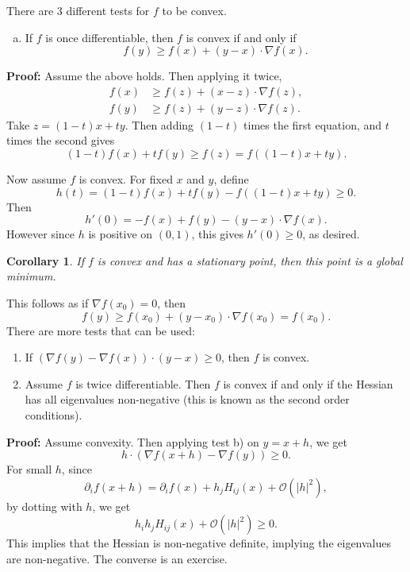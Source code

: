 \documentclass[12pt]{article}
\newtheorem{corollary}{Corollary}[section]
\theoremstyle{definition}
\theoremstyle{remark}
\begin{document}
There are 3 different tests for $f$ to be convex.

\begin{enumerate}[a)]
	\item If $f$ is once differentiable, then $f$ is convex if and only if
		\[
			f(y) \geq f(x) + (y - x) \cdot \nabla f(x)
		.\]
\end{enumerate}

\begin{adjustbox}{minipage = \columnwidth - 25.5pt, margin=1em, frame=1pt, margin=0em}
\textbf{Proof:} Assume the above holds. Then applying it twice,
\begin{align*}
	f(x) &\geq f(z) + (x - z) \cdot \nabla f(z), \\
	f(y) &\geq f(z) + (y - z) \cdot \nabla f(z).
\end{align*}
Take $z = (1 - t)x + ty$. Then adding $(1 - t)$ times the first equation, and $t$ times the second gives
\[
	(1 - t)f(x) + tf(y) \geq f(z) = f((1 - t)x + ty)
.\]
\end{adjustbox}

\begin{adjustbox}{minipage = \columnwidth - 25.5pt, margin=1em, frame=1pt, margin=0em}
	Now assume $f$ is convex. For fixed $x$ and $y$, define
	\[
		h(t) = (1 - t)f(x) + tf(y) - f((1 - t)x + ty) \geq 0
	.\]
	Then
	\[
		h'(0) = -f(x) + f(y) - (y - x) \cdot \nabla f(x)
	.\]
	However since $h$ is positive on $(0, 1)$, this gives $h'(0) \geq 0$, as desired.
\end{adjustbox}

\begin{corollary}
	If $f$ is convex and has a stationary point, then this point is a global minimum.
\end{corollary}

This follows as if $\nabla f(x_0) = 0$, then
\[
	f(y) \geq f(x_0) + (y - x_0) \cdot \nabla f(x_0) = f(x_0)
.\]
There are more tests that can be used:
\begin{enumerate}[resume*]
	\item If $(\nabla f(y) - \nabla f(x)) \cdot (y - x) \geq 0$, then $f$ is convex.
	\item Assume $f$ is twice differentiable. Then $f$ is convex if and only if the Hessian has all eigenvalues non-negative (this is known as the second order conditions).
\end{enumerate}

\begin{adjustbox}{minipage = \columnwidth - 25.5pt, margin=1em, frame=1pt, margin=0em}
	\textbf{Proof:} Assume convexity. Then applying test b) on $y = x + h$, we get
	\[
		h \cdot (\nabla f(x + h) - \nabla f(y)) \geq 0
	.\]
	For small $h$, since
	\[
		\partial_{i}f(x + h) = \partial_{i}f(x) + h_j H_{ij}(x) + \mathcal{O}(|h|^2)
	,\]
	by dotting with $h$, we get
	\[
		h_ih_j H_{ij}(x) + \mathcal{O}(|h|^2) \geq 0
	.\]
	This implies that the Hessian is non-negative definite, implying the eigenvalues are non-negative. The converse is an exercise.
\end{adjustbox}
\end{document}
